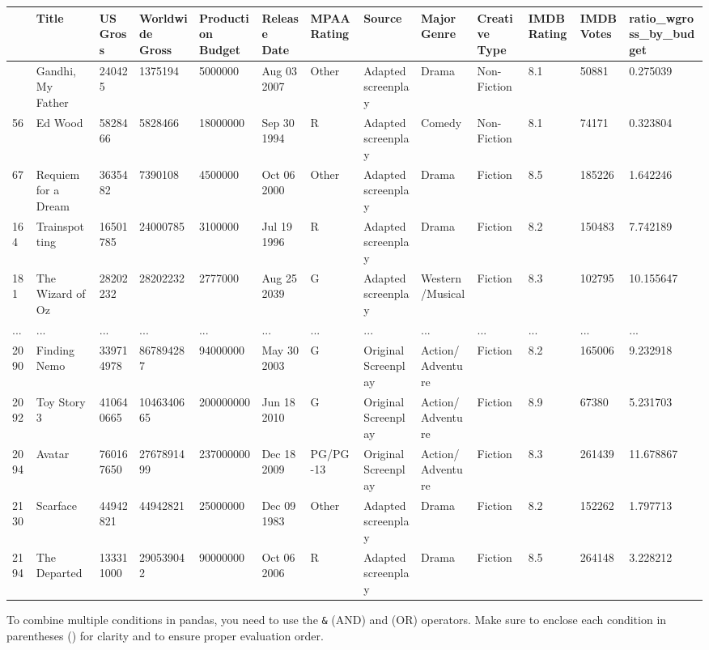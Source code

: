 \documentclass[
  letterpaper,
  DIV=11,
  numbers=noendperiod]{scrreprt}
\begin{document}
\begin{longtable}[]{@{}lllllllllllll@{}}
\toprule\noalign{}
& Title & US Gross & Worldwide Gross & Production Budget & Release Date
& MPAA Rating & Source & Major Genre & Creative Type & IMDB Rating &
IMDB Votes & ratio\_wgross\_by\_budget \\
\midrule\noalign{}
\endhead
\bottomrule\noalign{}
\endlastfoot
21 & Gandhi, My Father & 240425 & 1375194 & 5000000 & Aug 03 2007 &
Other & Adapted screenplay & Drama & Non-Fiction & 8.1 & 50881 &
0.275039 \\
56 & Ed Wood & 5828466 & 5828466 & 18000000 & Sep 30 1994 & R & Adapted
screenplay & Comedy & Non-Fiction & 8.1 & 74171 & 0.323804 \\
67 & Requiem for a Dream & 3635482 & 7390108 & 4500000 & Oct 06 2000 &
Other & Adapted screenplay & Drama & Fiction & 8.5 & 185226 &
1.642246 \\
164 & Trainspotting & 16501785 & 24000785 & 3100000 & Jul 19 1996 & R &
Adapted screenplay & Drama & Fiction & 8.2 & 150483 & 7.742189 \\
181 & The Wizard of Oz & 28202232 & 28202232 & 2777000 & Aug 25 2039 & G
& Adapted screenplay & Western/Musical & Fiction & 8.3 & 102795 &
10.155647 \\
... & ... & ... & ... & ... & ... & ... & ... & ... & ... & ... & ... &
... \\
2090 & Finding Nemo & 339714978 & 867894287 & 94000000 & May 30 2003 & G
& Original Screenplay & Action/Adventure & Fiction & 8.2 & 165006 &
9.232918 \\
2092 & Toy Story 3 & 410640665 & 1046340665 & 200000000 & Jun 18 2010 &
G & Original Screenplay & Action/Adventure & Fiction & 8.9 & 67380 &
5.231703 \\
2094 & Avatar & 760167650 & 2767891499 & 237000000 & Dec 18 2009 &
PG/PG-13 & Original Screenplay & Action/Adventure & Fiction & 8.3 &
261439 & 11.678867 \\
2130 & Scarface & 44942821 & 44942821 & 25000000 & Dec 09 1983 & Other &
Adapted screenplay & Drama & Fiction & 8.2 & 152262 & 1.797713 \\
2194 & The Departed & 133311000 & 290539042 & 90000000 & Oct 06 2006 & R
& Adapted screenplay & Drama & Fiction & 8.5 & 264148 & 3.228212 \\
\end{longtable}

To combine multiple conditions in pandas, you need to use the
\texttt{\&} (AND) and \texttt{\textbar{}} (OR) operators. Make sure to
enclose each condition in parentheses () for clarity and to ensure
proper evaluation order.
\end{document}
